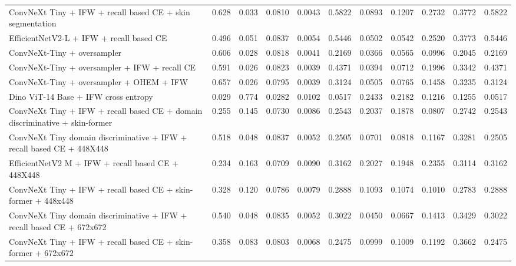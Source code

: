 \begin{table}[H]
{\begin{tabular}{|l|c|c|c|c|c|c|c|c|c|c|}
ConvNeXt Tiny + IFW + recall based CE + skin segmentation & 0.628 & 0.033 & 0.0810 & 0.0043 & 0.5822 & 0.0893 & 0.1207 & 0.2732 & 0.3772 & 0.5822 \\
EfficientNetV2-L + IFW + recall based CE & 0.496 & 0.051 & 0.0837 & 0.0054 & 0.5446 & 0.0502 & 0.0542 & 0.2520 & 0.3773 & 0.5446 \\
ConvNeXt-Tiny + oversampler & 0.606 & 0.028 & 0.0818 & 0.0041 & 0.2169 & 0.0366 & 0.0565 & 0.0996 & 0.2045 & 0.2169 \\
ConvNeXt-Tiny + oversampler + IFW + recall CE & 0.591 & 0.026 & 0.0823 & 0.0039 & 0.4371 & 0.0394 & 0.0712 & 0.1996 & 0.3342 & 0.4371 \\
ConvNeXt-Tiny + oversampler + OHEM + IFW & 0.657 & 0.026 & 0.0795 & 0.0039 & 0.3124 & 0.0505 & 0.0765 & 0.1458 & 0.3235 & 0.3124 \\
Dino ViT-14 Base + IFW cross entropy & 0.029 & 0.774 & 0.0282 & 0.0102 & 0.0517 & 0.2433 & 0.2182 & 0.1216 & 0.1255 & 0.0517 \\
ConvNeXt Tiny + IFW + recall based CE + domain discriminative + skin-former & 0.255 & 0.145 & 0.0730 & 0.0086 & 0.2543 & 0.2037 & 0.1878 & 0.0807 & 0.2742 & 0.2543 \\
ConvNeXt Tiny domain discriminative + IFW + recall based CE + 448X448 & 0.518 & 0.048 & 0.0837 & 0.0052 & 0.2505 & 0.0701 & 0.0818 & 0.1167 & 0.3281 & 0.2505 \\
EfficientNetV2 M + IFW + recall based CE + 448X448 & 0.234 & 0.163 & 0.0709 & 0.0090 & 0.3162 & 0.2027 & 0.1948 & 0.2355 & 0.3114 & 0.3162 \\
ConvNeXt Tiny + IFW + recall based CE + skin-former + 448x448  & 0.328 & 0.120 & 0.0786 & 0.0079 & 0.2888 & 0.1093 & 0.1074 & 0.1010 & 0.2783 & 0.2888 \\
ConvNeXt Tiny domain discriminative + IFW + recall based CE + 672x672 & 0.540 & 0.048 & 0.0835 & 0.0052 & 0.3022 & 0.0450 & 0.0667 & 0.1413 & 0.3429 & 0.3022 \\
ConvNeXt Tiny + IFW + recall based CE + skin-former + 672x672 & 0.358 & 0.083 & 0.0803 & 0.0068 & 0.2475 & 0.0999 & 0.1009 & 0.1192 & 0.3662 & 0.2475 \\
\bottomrule
\end{tabular}%
}
\end{table}
